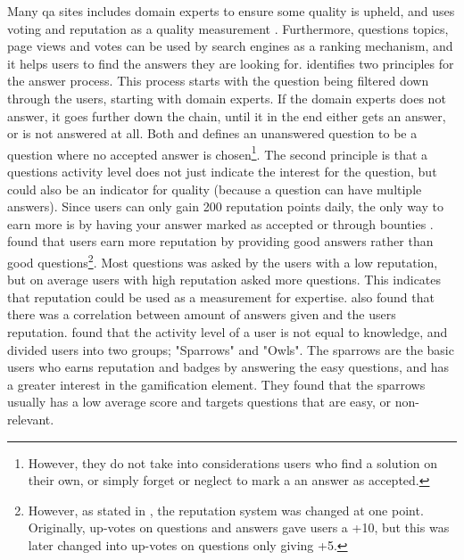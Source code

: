 Many \gls{qa} sites includes domain experts to ensure some quality is upheld, and uses voting and reputation as a quality measurement \cite{Anderson2012}.
Furthermore, questions topics, page views and votes can be used by search engines as a ranking mechanism, and it helps users to find the answers they are looking for. 
\textcite{Anderson2012} identifies two principles for the answer process. 
This process starts with the question being filtered down through the users, starting with domain experts. 
If the domain experts does not answer, it goes further down the chain, until it in the end either gets an answer, or is not answered at all.
Both \textcite{Anderson2012} and \textcite{Treude2011} defines an unanswered question to be a question where no accepted answer is chosen\footnote{
	However, they do not take into considerations users who find a solution on their own, or simply forget or neglect to mark a an answer as accepted.
}. 
The second principle is that a questions activity level does not just indicate the interest for the question, but could also be an indicator for quality 
(because a question can have multiple answers). 
\vspace{0.5em}\newline
Since users can only gain 200 reputation points daily, the only way to earn more is by having your answer marked as accepted or through bounties \cite{StackOverflow.com2016d}.
\textcite{Movshovitz-Attias2013} found that users earn more reputation by providing good answers rather than good 
questions\footnote{
	However, as stated in \textcite[p.~3]{Movshovitz-Attias2013}, the reputation system was changed at one point. 
	Originally, up-votes on questions and answers gave users a +10, but this was later changed into up-votes on questions only giving +5. 
}.
Most questions was asked by the users with a low reputation, but on average users with high reputation asked more questions. 
This indicates that reputation could be used as a measurement for expertise. 
\textcite{Ahmed2015} also found that there was a correlation between amount of answers given and the users reputation.
\vspace{0.5em}\newline
\textcite{Yang2014} found that the activity level of a user is not equal to knowledge, and divided users into two groups; "Sparrows" and "Owls".
The sparrows are the basic users who earns reputation and badges by answering the easy questions, and has a greater interest in the gamification element. 
They found that the sparrows usually has a low average score and targets questions that are easy, or non-relevant. 
